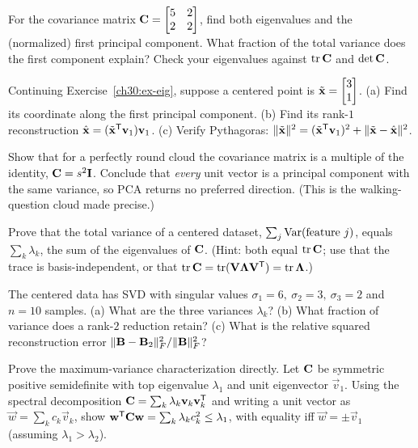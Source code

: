 \begin{exercise}\label{ch30:ex-eig}
For the covariance matrix $\mathbf{C}=\begin{bmatrix}5&2\\2&2\end{bmatrix}$, find both
eigenvalues and the (normalized) first principal component. What fraction of the
total variance does the first component explain? Check your eigenvalues against
$\operatorname{tr}\mathbf{C}$ and $\det\mathbf{C}$.
\end{exercise}

\begin{exercise}\label{ch30:ex-project}
Continuing Exercise~\ref{ch30:ex-eig}, suppose a centered point is
$\tilde{\mathbf{x}}=\begin{bmatrix}3\\1\end{bmatrix}$. (a) Find its coordinate along the first principal
component. (b) Find its rank-$1$ reconstruction $\hat{\mathbf{x}}=(\tilde{\mathbf{x}}^{\mathsf{T}}\mathbf{v}_1)\mathbf{v}_1$. (c) Verify Pythagoras: $\lVert\tilde{\mathbf{x}}\rVert^2=(\tilde{\mathbf{x}}^{\mathsf{T}}\mathbf{v}_1)^2+\lVert\tilde{\mathbf{x}}-\hat{\mathbf{x}}\rVert^2$.
\end{exercise}

\begin{exercise}\label{ch30:ex-round}
Show that for a perfectly round cloud the covariance matrix is a multiple of the
identity, $\mathbf{C}=s^2\mathbf{I}$. Conclude that \emph{every} unit vector is a principal
component with the same variance, so PCA returns no preferred direction. (This is
the walking-question cloud made precise.)
\end{exercise}

\begin{exercise}\label{ch30:ex-trace}
Prove that the total variance of a centered dataset, $\sum_j\operatorname{Var}(\text{feature }j)$,
equals $\sum_k\lambda_k$, the sum of the eigenvalues of $\mathbf{C}$. (Hint: both equal
$\operatorname{tr}\mathbf{C}$; use that the trace is basis-independent, or that
$\operatorname{tr}\mathbf{C}=\operatorname{tr}(\mathbf{V}\mathbf{\Lambda}\mathbf{V}^{\mathsf{T}})=\operatorname{tr}\mathbf{\Lambda}$.)
\end{exercise}

\begin{exercise}\label{ch30:ex-svd}
The centered data has SVD with singular values $\sigma_1=6,\ \sigma_2=3,\
\sigma_3=2$ and $n=10$ samples. (a) What are the three variances $\lambda_k$?
(b) What fraction of variance does a rank-$2$ reduction retain? (c) What is the
relative squared reconstruction error $\lVert\mathbf{B}-\mathbf{B}_2\rVert_F^2/\lVert\mathbf{B}\rVert_F^2$?
\end{exercise}

\begin{exercise}\label{ch30:ex-maxvar}
Prove the maximum-variance characterization directly. Let $\mathbf{C}$ be symmetric
positive semidefinite with top eigenvalue $\lambda_1$ and unit eigenvector
$\vec v_1$. Using the spectral decomposition $\mathbf{C}=\sum_k\lambda_k\mathbf{v}_k\mathbf{v}_k^{\mathsf{T}}$ and writing a unit vector as $\vec w=\sum_k c_k\vec v_k$, show
$\mathbf{w}^{\mathsf{T}}\mathbf{C}\mathbf{w}=\sum_k\lambda_k c_k^2\le\lambda_1$, with equality iff
$\vec w=\pm\vec v_1$ (assuming $\lambda_1 > \lambda_2$).
\end{exercise}


